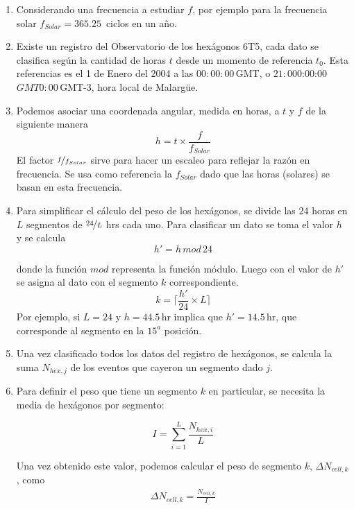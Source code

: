       \begin{enumerate}
        \item Considerando una frecuencia a estudiar $f$, por ejemplo para la frecuencia solar $f_{Solar}= 365.25\,$ ciclos en un año.

        \item Existe un registro del Observatorio de los hexágonos 6T5, cada dato se clasifica según la cantidad de horas $t$ desde un momento de referencia $t_0$.
        Esta referencias es el 1 de Enero del 2004 a las $00:00:00\,$GMT, o  $21:0 $00:00:00\,$GMT0:00\,$GMT-3, hora local de Malargüe.

        \item Podemos asociar una coordenada angular, medida en horas,  a $t$  y $f$ de la siguiente manera
         \begin{equation*}
          h = t \times \frac{f}{f_{Solar}}
          \label{eq:h}
        \end{equation*}
        El factor $\nicefrac{f}{f_{Solar}}$ sirve para hacer un escaleo para reflejar la razón en frecuencia. Se usa como referencia la $f_{Solar}$ dado que las horas (solares) se basan en esta frecuencia.
        
        \item Para simplificar el cálculo del peso de los hexágonos, se divide las 24 horas en $L$ segmentos de $\nicefrac{24}{L}$ hrs cada uno. Para clasificar un dato se  toma  el valor $h$  y se calcula
        \begin{equation}
                  h' = h\, mod \,24
                  \label{eq:h_prime}
        \end{equation}

        donde la función $mod$ representa la función módulo. Luego con el valor de $h'$ se asigna al dato con el segmento $k$ correspondiente.
        \begin{equation}
          k = \bigg \lceil \frac{h'}{24}\times L \bigg \rceil
        \end{equation}
        Por ejemplo, si $L=24$ y  $h=44.5\,$hr implica que $h'= 14.5\,$hr, que corresponde al segmento en la $15^{a}$ posición.

        \item Una vez clasificado todos los datos del registro de hexágonos, se calcula la suma  $N_{hex, j}$ de los eventos que cayeron un segmento dado $j$.

        \item Para definir el peso que tiene un segmento $k$ en particular, se necesita la media de hexágonos por segmento:
       
       \begin{equation}
         I = \sum^{L}_{i=1} \frac{N_{hex, i}}{L}
       \end{equation}
       
       Una vez obtenido este valor, podemos calcular el peso de segmento $k$,  $\Delta N_{cell,k}$, como 
      \begin{align}
         \Delta N_{cell,k} = \frac{N_{cell, k}}{I}
      \end{align} 
      \end{enumerate}

